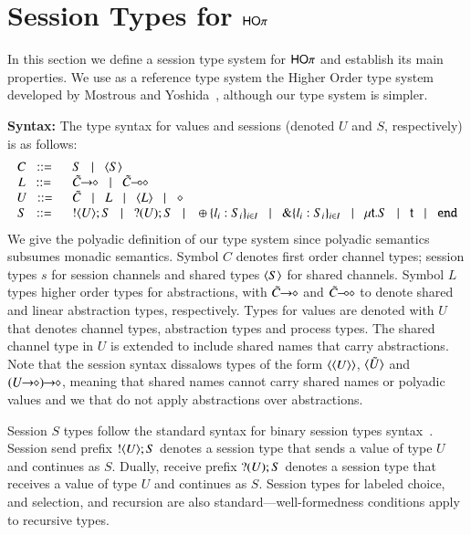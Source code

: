 \section{Session Types for $\mathsf{HO}\pi$}
\label{s:types}

In this section we define a session type system for
$\mathsf{HO}\pi$ and establish its main properties. We use as
a reference type system the Higher Order type system
developed by Mostrous and Yoshida~\cite{tlca07}, although
our type system is simpler.


{\bf Syntax:}
The type syntax for values and sessions
(denoted $U$ and $S$, respectively) is as follows:
%
\[
\begin{array}{cl}
	C \bnfis &	S \bnfbar \chtype{S}
	\\

	L \bnfis &	\shot{\tilde{C}} \bnfbar \lhot{\tilde{C}}
	\\

	U \bnfis &	\tilde{C} \bnfbar L \bnfbar \chtype{L} \bnfbar \Proc
	\\

	S \bnfis & 	\btout{U} S \bnfbar \btinp{U} S
			\bnfbar \btsel{l_i:S_i}_{i \in I} \bnfbar \btbra{l_i:S_i}_{i \in I}
			\bnfbar \trec{t}{S} \bnfbar \vart{t}  \bnfbar \tinact
\end{array}
\]
%
\noi
We give the polyadic definition of our type system since
polyadic semantics subsumes monadic semantics.
Symbol $C$ denotes first order channel types; session types $s$
for session channels and shared types $\langle S \rangle$ for shared channels.
Symbol $L$ types higher order types for abstractions,
with $\tilde{C}\!\! \rightarrow\!\! \diamond$ and $\tilde{C}\!\! \multimap\!\! \diamond$ to denote
shared and linear abstraction types, respectively.
Types for values are denoted with $U$ that denotes
channel types, abstraction types and process types.
The shared channel type in $U$ is extended
to include shared names that carry abstractions.
Note that the session syntax dissalows types of
the form $\langle \langle U \rangle \rangle$, $\langle \tilde{U} \rangle$
and $\shot{(\shot{U})}$,
meaning that shared names cannot carry shared names or
polyadic values and
we that do not apply abstractions over abstractions.

Session $S$ types follow the standard syntax for
binary session types syntax~\cite{}.
Session send prefix $! \langle U \rangle ; S$ denotes a session type that
sends a value of type $U$ and continues as $S$.
Dually, receive prefix $? (U) ; S$ denotes a session type 
that receives a value of type $U$ and continues as $S$. 
Session types for labeled choice, and selection, and recursion
are also standard---well-formedness conditions apply to recursive types.

